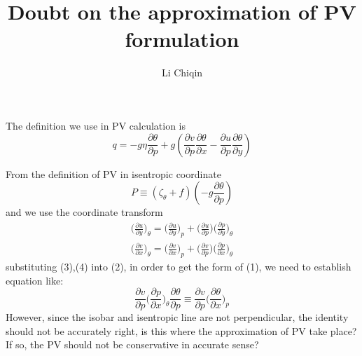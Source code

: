 \documentclass[12pt]{article}
\begin{document}
\title{Doubt on the approximation of PV formulation}
\author{Li Chiqin}
\maketitle

The definition we use in PV calculation is
\begin{equation}
    q = -g\eta\frac{\partial{\theta}}{\partial{p}} + g(\frac{\partial{v}}{\partial{p}}
    \frac{\partial{\theta}}{\partial{x}} - \frac{\partial{u}}{\partial{p}} \frac{\partial{\theta}}{\partial{y}})
\end{equation}

From the definition of PV in isentropic coordinate
\begin{equation}
    P \equiv (\zeta_{\theta} + f)(-g \frac{\partial{\theta}}{\partial{p}})
\end{equation}
and we use the coordinate transform
\begin{gather}
    \Big(\frac{\partial{u}}{\partial{y}}\Big)_{\theta} = \Big(\frac{\partial{u}}{\partial{y}}\Big)_{p}
    + \Big(\frac{\partial{u}}{\partial{p}}\Big) \Big(\frac{\partial{p}}{\partial{y}}\Big)_{\theta}\\
    \Big(\frac{\partial{v}}{\partial{x}}\Big)_{\theta} = \Big(\frac{\partial{v}}{\partial{x}}\Big)_{p}
    + \Big(\frac{\partial{v}}{\partial{p}}\Big) \Big(\frac{\partial{p}}{\partial{x}}\Big)_{\theta}
\end{gather}
substituting (3),(4) into (2), in order to get the form of (1), we need to establish equation like:
\begin{equation}
    \frac{\partial{v}}{\partial{p}} \Big(\frac{\partial{p}}{\partial{x}}\Big)_{\theta}
    \frac{\partial{\theta}}{\partial{p}} \equiv \frac{\partial{v}}{\partial{p}} \Big(\frac{\partial{\theta}}{\partial{x}}\Big)_{p}
\end{equation}
However, since the isobar and isentropic line are not perpendicular, the identity should not be accurately right,
is this where the approximation of PV take place? If so, the PV should not be conservative in accurate sense?
\end{document}
